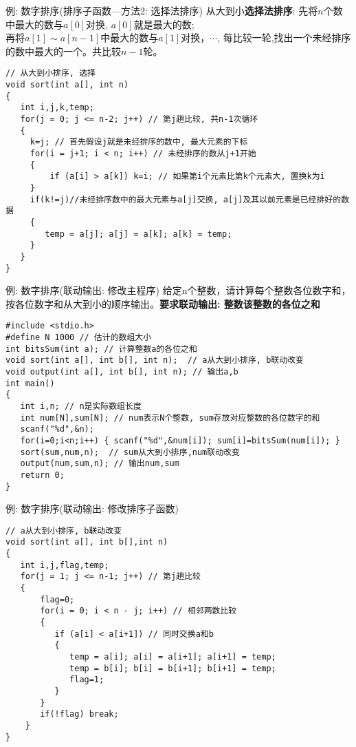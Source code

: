 \begin{frame}{例: 数字排序(排序子函数---方法2: 选择法排序)}
从大到小\textbf{选择法排序}: 先将$n$个数中最大的数与$a[0]$对换, $a[0]$就是最大的数;\\
再将$a[1]\sim a[n-1]$中最大的数与$a[1]$对换，$\cdots$, 每比较一轮,找出一个未经排序的数中最大的一个。共比较$n-1$轮。
\begin{lstlisting}
// 从大到小排序, 选择
void sort(int a[], int n)
{
   int i,j,k,temp;
   for(j = 0; j <= n-2; j++) // 第j趟比较, 共n-1次循环
   {
     k=j; // 首先假设j就是未经排序的数中, 最大元素的下标
     for(i = j+1; i < n; i++) // 未经排序的数从j+1开始
     {
         if (a[i] > a[k]) k=i; // 如果第i个元素比第k个元素大, 置换k为i
     }
     if(k!=j)//未经排序数中的最大元素与a[j]交换, a[j]及其以前元素是已经排好的数据
     { 
        temp = a[j]; a[j] = a[k]; a[k] = temp; 
     }
   }
}
\end{lstlisting}
\end{frame}


\begin{frame}{例: 数字排序(联动输出: 修改主程序)}
给定n个整数，请计算每个整数各位数字和，按各位数字和从大到小的顺序输出。\textbf{要求联动输出: 整数\quad 该整数的各位之和}
\begin{lstlisting}
#include <stdio.h>
#define N 1000 // 估计的数组大小
int bitsSum(int a); // 计算整数a的各位之和
void sort(int a[], int b[], int n);  // a从大到小排序, b联动改变
void output(int a[], int b[], int n); // 输出a,b
int main()
{
   int i,n; // n是实际数组长度 
   int num[N],sum[N]; // num表示N个整数, sum存放对应整数的各位数字的和  
   scanf("%d",&n);
   for(i=0;i<n;i++) { scanf("%d",&num[i]); sum[i]=bitsSum(num[i]); }
   sort(sum,num,n);  // sum从大到小排序,num联动改变
   output(num,sum,n); // 输出num,sum
   return 0;
}
\end{lstlisting}
\end{frame}

\begin{frame}{例: 数字排序(联动输出: 修改排序子函数)}
\begin{lstlisting}
// a从大到小排序, b联动改变
void sort(int a[], int b[],int n)
{
   int i,j,flag,temp;
   for(j = 1; j <= n-1; j++) // 第j趟比较
   {
       flag=0;
       for(i = 0; i < n - j; i++) // 相邻两数比较
       {
          if (a[i] < a[i+1]) // 同时交换a和b
          { 
             temp = a[i]; a[i] = a[i+1]; a[i+1] = temp; 
             temp = b[i]; b[i] = b[i+1]; b[i+1] = temp; 
             flag=1;
          }
       }
       if(!flag) break;
    }
}
\end{lstlisting}
\end{frame}


